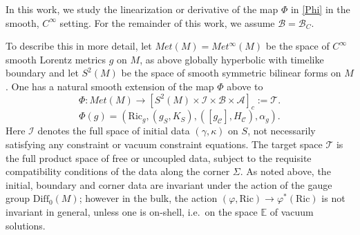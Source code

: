 \documentclass[10pt]{amsart}
\renewcommand{\a}{\alpha}
\newcommand{\g}{\gamma}
\newcommand{\f}{\varphi}
\newcommand{\Si}{\Sigma}
\renewcommand{\k}{\kappa}
\newcommand{\cA}{{\mathcal A}}
\newcommand{\cC}{{\mathcal C}}
\newcommand{\cT}{{\mathcal T}}
\newcommand{\cB}{{\mathcal B}}
\newcommand{\cI}{\mathcal I}
\newcommand{\bE}{\mathbb E}
\newcommand{\Ric}{\mathrm{Ric}}
\newcommand{\Diff}{\mathrm{Diff}}
\newcommand{\be}{\begin{equation}}
\newcommand{\ee}{\end{equation}}
\renewcommand{\to}{\rightarrow}
\newcommand{\<}{\langle}
\renewcommand{\>}{\rangle}
\theoremstyle{plain}
\theoremstyle{remark}
\theoremstyle{definition}
\numberwithin{equation}{section}
\begin{document}
\medskip 

  In this work, we study the linearization or derivative of the map $\Phi$ in \eqref{Phi} in the smooth, $C^{\infty}$ setting. For the remainder of this work, 
we assume $\cB = \cB_C$. 

   To describe this in more detail, let $Met(M) = Met^{\infty}(M)$ be the space of $C^{\infty}$ smooth Lorentz metrics $g$ on $M$, as above globally 
hyperbolic with timelike boundary and let $S^2(M)$ be the space of smooth symmetric bilinear forms on $M$.  One has a natural smooth extension 
of the map $\Phi$ above to 
\be \label{Phi1}
\Phi: Met(M) \to [S^2(M) \times \cI \times \cB \times \cA]_c := \cT.
\ee
$$\Phi(g) = (\Ric_g, (g_S, K_S), ([g_{\cC}], H_{\cC}), \a_g).$$
Here $\cI$ denotes the full space of initial data $(\g, \k)$ on $S$, not necessarily satisfying any constraint or vacuum constraint equations. The target 
space $\cT$ is the full product space of free or uncoupled data, subject to the requisite compatibility conditions of the data along the corner $\Si$. 
As noted above, the initial, boundary and corner data are invariant under the action of the gauge group $\Diff_0(M)$; however in the bulk, the action 
$(\f, \Ric) \to \f^*(\Ric)$ is not invariant in general, unless one is on-shell, i.e.~on the space $\bE$ of vacuum solutions. 
\end{document}
